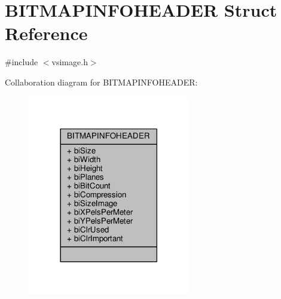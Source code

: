 \hypertarget{structBITMAPINFOHEADER}{}\section{B\+I\+T\+M\+A\+P\+I\+N\+F\+O\+H\+E\+A\+D\+ER Struct Reference}
\label{structBITMAPINFOHEADER}


{\ttfamily \#include $<$vsimage.\+h$>$}



Collaboration diagram for B\+I\+T\+M\+A\+P\+I\+N\+F\+O\+H\+E\+A\+D\+ER\+:
\nopagebreak
\begin{figure}[H]
\begin{center}
\leavevmode
\includegraphics[width=201pt]{d6/dd2/structBITMAPINFOHEADER__coll__graph}
\end{center}
\end{figure}
